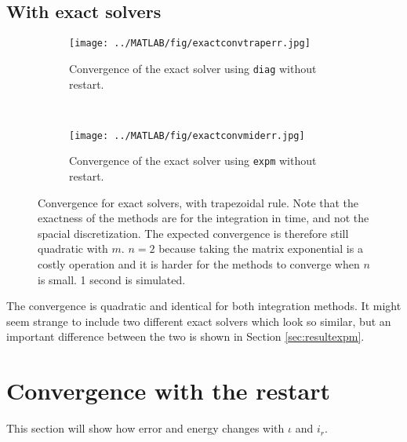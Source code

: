 \subsection{With exact solvers} %
\label{sec:exactconv}
\begin{figure}[H]
        \centering
        \begin{subfigure}[b]{0.3\textwidth}
                \texttt{[image: ../MATLAB/fig/exactconvtraperr.jpg]}
                \caption{ Convergence of the exact solver using \texttt{diag} without restart. }
                \label{fig:exactconvtraperr}
        \end{subfigure}
        ~
        \begin{subfigure}[b]{0.3\textwidth}
                \texttt{[image: ../MATLAB/fig/exactconvmiderr.jpg]}
                \caption{ Convergence of the exact solver using \texttt{expm} without restart. }  
				\label{fig:exactconvmiderr}
        \end{subfigure}         
       
\caption{Convergence for exact solvers, with trapezoidal rule. Note that the exactness of the methods are for the integration in time, and not the spacial discretization. The expected convergence is therefore still quadratic with $m$. $n = 2$ because taking the matrix exponential is a costly operation and it is harder for the methods to converge when $n$ is small. 1 second is simulated. } %
\label{fig:intexactt}
\end{figure}
The convergence is quadratic and identical for both integration methods. It might seem strange to include two different exact solvers which look so similar, but an important difference between the two is shown in Section \ref{sec:resultexpm}.

\section{Convergence with the restart}%
This section will show how error and energy changes with $\iota$ and $i_r$.
